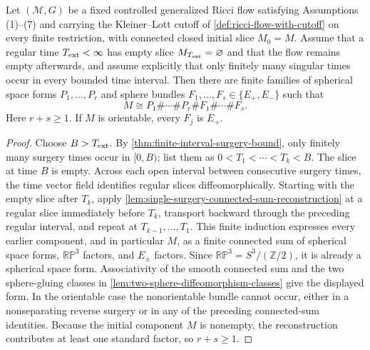 \begin{theorem}
\label{thm:extinction-connected-sum-classification}
\notready
Let $({\mathcal M},G)$ be a fixed controlled generalized Ricci flow satisfying
Assumptions (1)--(7) and carrying the Kleiner--Lott cutoff of
\ref{def:ricci-flow-with-cutoff} on every finite restriction, with
connected closed initial slice $M_0=M$.  Assume that a regular time
$T_{\rm ext}<\infty$ has empty slice $M_{T_{\rm ext}}=\varnothing$ and that
the flow remains empty afterwards, and assume explicitly that only finitely
many singular times occur in every bounded time interval.  Then there are finite families of
spherical space forms $P_1,\ldots,P_r$ and sphere bundles
$F_1,\ldots,F_s\in\{E_+,E_-\}$ such that
\[
 M\cong P_1\#\cdots\#P_r\#F_1\#\cdots\#F_s.
\]
Here $r+s\ge1$.
If $M$ is orientable, every $F_j$ is $E_+$.
\end{theorem}

\begin{proof}
Choose $B>T_{\rm ext}$.  By \ref{thm:finite-interval-surgery-bound}, only finitely many
surgery times occur in $[0,B)$; list them as
$0<T_1<\cdots<T_k<B$.  The slice at time $B$ is empty.  Across each open
interval between consecutive surgery times, the time vector field identifies
regular slices diffeomorphically.  Starting with the empty slice after $T_k$,
apply \ref{lem:single-surgery-connected-sum-reconstruction} at a regular slice
immediately before $T_k$, transport backward through the preceding regular
interval, and repeat at $T_{k-1},\ldots,T_1$.
This finite induction expresses every earlier component, and in particular
$M$, as a finite connected sum of spherical space forms, $\mathbb{RP}^3$
factors, and $E_\pm$ factors.  Since
$\mathbb{RP}^3=S^3/(\mathbb Z/2)$, it is already a spherical space form.
Associativity of the smooth connected sum and the two sphere-gluing classes in
\ref{lem:two-sphere-diffeomorphism-classes} give the displayed form.  In the
orientable case the nonorientable bundle cannot occur, either in a
nonseparating reverse surgery or in any of the preceding connected-sum
identities.
Because the initial component $M$ is nonempty, the reconstruction contributes
at least one standard factor, so $r+s\ge1$.
\end{proof}

